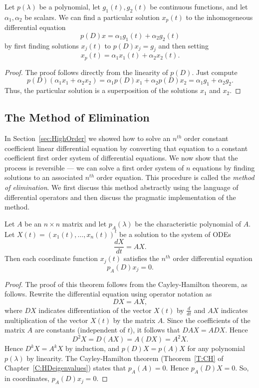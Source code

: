 \documentclass{ximera}
\begin{document}
\begin{lemma}  \label{L:inhsup}
Let $p(\lambda)$ be a polynomial, let $g_1(t),g_2(t)$ be continuous 
functions, and let $\alpha_1,\alpha_2$ be scalars.  We can find a particular 
solution $x_p(t)$ to the inhomogeneous differential equation
\[
p(D)x = \alpha_1g_1(t) + \alpha_2g_2(t)
\]
by first finding solutions $x_j(t)$ to $p(D)x_j = g_j$ and then setting 
\[
x_p(t) = \alpha_1x_1(t) + \alpha_2x_2(t).
\]
\end{lemma}

\begin{proof}  The proof follows directly from the linearity of $p(D)$.  Just 
compute
\[
p(D)(\alpha_1x_1 + \alpha_2x_2) = \alpha_1p(D)x_1 + 
\alpha_2p(D)x_2 = \alpha_1g_1 + \alpha_2g_2.
\]
Thus, the particular solution is a superposition of the solutions $x_1$ and
$x_2$.  \end{proof}

\subsection*{The Method of Elimination}

In Section~\ref{sec:HighOrder} we showed how to solve an $n^{th}$ order 
constant coefficient linear differential equation by converting that equation 
to a constant coefficient first order system of differential equations.  We 
now show that the process is reversible --- we can solve a first order 
system of $n$ equations by finding solutions to an associated $n^{th}$ order 
equation.  This procedure is called the {\em method of elimination\/}.
  We first discuss this method abstractly using 
the language of differential operators and then discuss the pragmatic 
implementation of the method.

\begin{theorem}  \label{T:Elimination}
Let $A$ be an $n\times n$ matrix and let $p_A(\lambda)$ be the characteristic 
polynomial of $A$.  Let $X(t)=(x_1(t),\ldots,x_n(t))^t$ be a solution to the 
system of ODEs 
\[
\frac{dX}{dt} = AX.
\]
Then each coordinate function $x_j(t)$ satisfies the $n^{th}$ order 
differential equation
\begin{equation}  \label{E:Elimination}
p_A(D)x_j = 0.
\end{equation}
\end{theorem}

\begin{proof}  The proof of this theorem follows from the Cayley-Hamilton 
theorem, as follows.   Rewrite the differential equation using operator 
notation as  
\[
DX = AX,
\]
where $DX$ indicates differentiation of the vector $X(t)$ by $\frac{d}{dt}$ 
and $AX$ indicates multiplication of the vector $X(t)$ by the matrix $A$.
Since the coefficients of the matrix $A$ are constants (independent of $t$), 
it follows that $DAX=ADX$.  Hence
\[
D^2X = D(AX) = A(DX) = A^2X.
\]
Hence $D^kX = A^kX$ by induction, and $p(D)X = p(A)X$ for any polynomial $p(\lambda)$ by linearity.  The Cayley-Hamilton theorem (Theorem~\ref{T:CH} 
of Chapter~\ref{C:HDeigenvalues}) states that $p_A(A)=0$.  Hence $p_A(D)X=0$.  
So, in coordinates, $p_A(D)x_j=0$. \end{proof}
\end{document}
